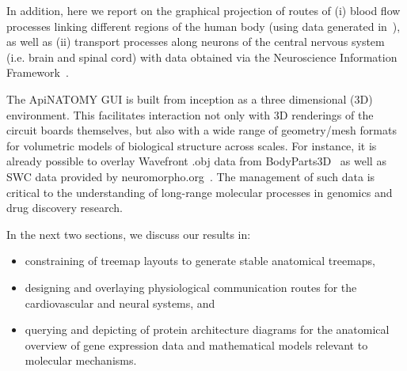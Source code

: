 In addition, here we report on the graphical projection of routes of (i) blood flow processes linking different regions of the human body (using data generated in~\cite{deB11}), as well as (ii) transport processes along neurons of the central nervous system (i.e. brain and spinal cord) with data obtained via the Neuroscience Information Framework~\cite{Gar+08}. 

The ApiNATOMY GUI is built from inception as a three dimensional (3D) environment. This facilitates interaction not only with 3D renderings of the circuit boards themselves, but also with a wide range of geometry/mesh formats for volumetric models of biological structure across scales. For instance, it is already possible to overlay Wavefront .obj data from BodyParts3D~\cite{MFT+09} as well as SWC data provided by neuromorpho.org~\cite{Asc06}. The management of such data is critical to the understanding of long-range molecular processes in genomics and drug discovery research.

In the next two sections, we discuss our results in:
\begin{itemize}
  \item constraining of treemap layouts to generate stable anatomical treemaps,
  \item designing and overlaying physiological communication routes for the cardiovascular and neural systems, and
  \item querying and depicting of protein architecture diagrams for the anatomical overview of gene expression data and mathematical models relevant to molecular mechanisms.
\end{itemize}

